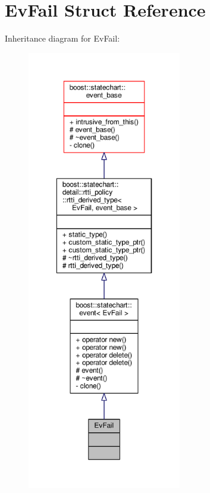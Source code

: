 \hypertarget{struct_ev_fail}{}\section{Ev\+Fail Struct Reference}
\label{struct_ev_fail}


Inheritance diagram for Ev\+Fail\+:
\nopagebreak
\begin{figure}[H]
\begin{center}
\leavevmode
\includegraphics[height=550pt]{struct_ev_fail__inherit__graph}
\end{center}
\end{figure}


